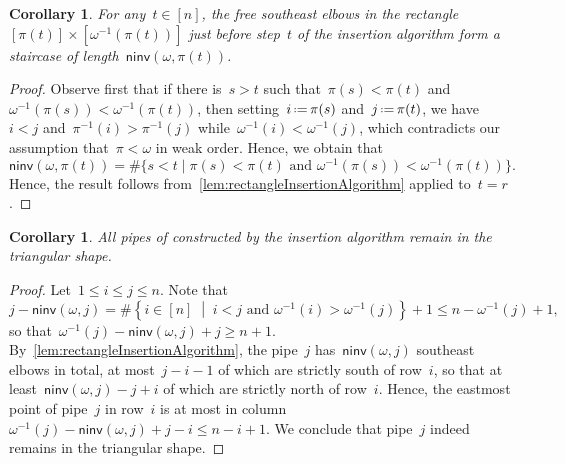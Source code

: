 \documentclass{amsart}
\newtheorem{corollary}[theorem]{Corollary}
\theoremstyle{definition}
\newcommand{\set}[2]{\left\{ #1 \;\middle|\; #2 \right\}} %
\newcommand{\bigset}[2]{\big\{ #1 \;|\; #2 \big\}} %
\newcommand{\eqdef}{\mbox{\,\raisebox{0.2ex}{\scriptsize\ensuremath{\mathrm:}}\ensuremath{=}\,}} %
\newcommand{\pipeDreams}{\Pi} %
\newcommand{\noninversions}[2]{\mathsf{ninv}(#1,#2)} %
\begin{document}
\begin{corollary}
\label{coro:rectangleInsertionAlgorithm1}
For any~$t \in [n]$, the free southeast elbows in the rectangle~$[\pi(t)] \times [\omega^{-1}(\pi(t))]$ just before step~$t$ of the insertion algorithm form a staircase of length~$\noninversions{\omega}{\pi(t)}$.
\end{corollary}

\begin{proof}
Observe first that if there is~$s > t$ such that~$\pi(s) < \pi(t)$ and~$\omega^{-1}(\pi(s)) < \omega^{-1}(\pi(t))$, then setting~$i \eqdef \pi(s)$ and~$j \eqdef \pi(t)$, we have~$i < j$ and~$\pi^{-1}(i) > \pi^{-1}(j)$ while~$\omega^{-1}(i) < \omega^{-1}(j)$, which contradicts our assumption that~$\pi < \omega$ in weak order.
Hence, we obtain that
\[
\noninversions{\omega}{\pi(t)} = \# \bigset{s < t}{\pi(s) < \pi(t) \text{ and } \omega^{-1}(\pi(s)) < \omega^{-1}(\pi(t))}.
\]
Hence, the result follows from~\cref{lem:rectangleInsertionAlgorithm} applied to~$t = r$.
\end{proof}

\begin{corollary}
\label{coro:rectangleInsertionAlgorithm2}
All pipes of constructed by the insertion algorithm remain in the triangular shape.
\end{corollary}

\begin{proof}
Let~$1 \le i \le j \le n$.
Note that
\[
j - \noninversions{\omega}{j} = \#\set{i \in [n]}{i < j \text{ and } \omega^{-1}(i) > \omega^{-1}(j)} + 1 \le n - \omega^{-1}(j) + 1,
\]
so that~$\omega^{-1}(j) - \noninversions{\omega}{j} + j \ge n + 1$.
By~\cref{lem:rectangleInsertionAlgorithm}, the pipe~$j$ has~$\noninversions{\omega}{j}$ southeast elbows in total, at most~$j-i-1$ of which are strictly south of row~$i$, so that at least~$\noninversions{\omega}{j} - j + i$ of which are strictly north of row~$i$.
Hence, the eastmost point of pipe~$j$ in row~$i$ is at most in column~$\omega^{-1}(j) - \noninversions{\omega}{j} + j - i \le n - i + 1$.
We conclude that pipe~$j$ indeed remains in the triangular shape.
\end{proof}

\end{document}
